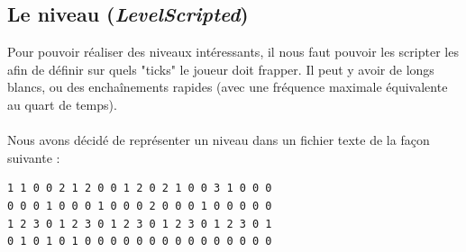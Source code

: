 \subsection{Le niveau (\textit{LevelScripted})}
\label{niveau}
Pour pouvoir réaliser des niveaux intéressants, il nous faut pouvoir les scripter les afin de définir sur quels "ticks" le joueur doit frapper. Il peut y avoir de longs blancs, ou des enchaînements rapides (avec une fréquence maximale équivalente au quart de temps).
\\\\
Nous avons décidé de représenter un niveau dans un fichier texte de la façon suivante :\\
\begin{lstlisting}
1 1 0 0 2 1 2 0 0 1 2 0 2 1 0 0 3 1 0 0 0
0 0 0 1 0 0 0 1 0 0 0 2 0 0 0 1 0 0 0 0 0
1 2 3 0 1 2 3 0 1 2 3 0 1 2 3 0 1 2 3 0 1
0 1 0 1 0 1 0 0 0 0 0 0 0 0 0 0 0 0 0 0 0
\end{lstlisting}
\paragraph{}

